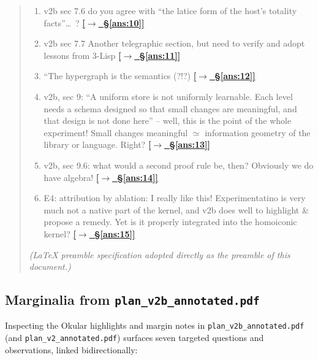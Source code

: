 \documentclass[12pt]{article}
\newcommand{\qtoans}[2]{\hyperref[#1]{\textcolor{qpurple}{\textbf{\small[\(\rightarrow\)~#2]}}}}
\begin{document}
\begin{quote}
\begin{enumerate}[label=\arabic*., leftmargin=1.8em, itemsep=0.25em]
  \item \hypertarget{q:10}{}v2b sec 7.6 do you agree with ``the latice form of the host's totality facts''\dots\ ? \qtoans{ans:10}{\S\ref{ans:10}}

  \item \hypertarget{q:11}{}v2b sec 7.7 Another telegraphic section, but need to verify and adopt lessons from 3-Lisp \qtoans{ans:11}{\S\ref{ans:11}}

  \item \hypertarget{q:12}{}``The hypergraph is the semantics (?!?) \qtoans{ans:12}{\S\ref{ans:12}}

  \item \hypertarget{q:13}{}v2b, sec 9: ``A uniform store is not uniformly learnable. Each level needs a schema designed so that small changes are meaningful, and that design is not done here'' -- well, this is the point of the whole experiment! Small changes meaningful $\simeq$ information geometry of the library or language. Right? \qtoans{ans:13}{\S\ref{ans:13}}

  \item \hypertarget{q:14}{}v2b, sec 9.6: what would a second proof rule be, then? Obviously we do have algebra! \qtoans{ans:14}{\S\ref{ans:14}}

  \item \hypertarget{q:15}{}E4: attribution by ablation: I really like this! Experimentatino is very much not a native part of the kernel, and v2b does well to highlight \& propose a remedy. Yet is it properly integrated into the homoiconic kernel? \qtoans{ans:15}{\S\ref{ans:15}}
\end{enumerate}

\noindent [1] \emph{(LaTeX preamble specification adopted directly as the preamble of this document.)}
\end{quote}

\subsection{Marginalia from \texttt{plan\_v2b\_annotated.pdf}}
\label{sec:marginalia}

Inspecting the Okular highlights and margin notes in \texttt{plan\_v2b\_\allowbreak annotated.pdf} (and \texttt{plan\_v2\_\allowbreak annotated.pdf}) surfaces seven targeted questions and observations, linked bidirectionally:
\end{document}
